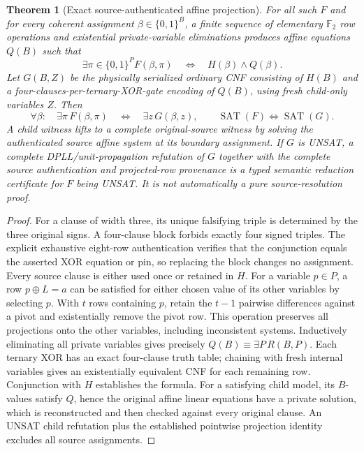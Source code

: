 \documentclass[11pt]{article}
\newtheorem{theorem}{Theorem}
\begin{document}
\begin{theorem}[Exact source-authenticated affine projection]
For all such $F$ and for \emph{every} coherent assignment $\beta\in\{0,1\}^{B}$, a finite sequence of elementary $\mathbb F_2$ row operations and existential private-variable eliminations produces affine equations $Q(B)$ such that
\[
  \exists\pi\in\{0,1\}^{P}F(\beta,\pi)
  \quad\Longleftrightarrow\quad H(\beta)\land Q(\beta).
\]
Let $G(B,Z)$ be the physically serialized ordinary CNF consisting of $H(B)$ and a four-clauses-per-ternary-XOR-gate encoding of $Q(B)$, using fresh child-only variables $Z$. Then
\[
  \forall\beta:\quad \exists\pi\,F(\beta,\pi)
  \quad\Longleftrightarrow\quad \exists z\,G(\beta,z),
  \qquad \operatorname{SAT}(F)\Longleftrightarrow\operatorname{SAT}(G).
\]
A child witness lifts to a complete original-source witness by solving the authenticated source affine system at its boundary assignment. If $G$ is UNSAT, a complete DPLL/unit-propagation refutation of $G$ together with the complete source authentication and projected-row provenance is a \emph{typed semantic reduction certificate} for $F$ being UNSAT. It is not automatically a pure source-resolution proof.
\end{theorem}
\begin{proof}
For a clause of width three, its unique falsifying triple is determined by the three original signs. A four-clause block forbids exactly four signed triples. The explicit exhaustive eight-row authentication verifies that the conjunction equals the asserted XOR equation or pin, so replacing the block changes no assignment. Every source clause is either used once or retained in $H$. For a variable $p\in P$, a row $p\oplus L=a$ can be satisfied for either chosen value of its other variables by selecting $p$. With $t$ rows containing $p$, retain the $t-1$ pairwise differences against a pivot and existentially remove the pivot row. This operation preserves all projections onto the other variables, including inconsistent systems. Inductively eliminating all private variables gives precisely $Q(B)\equiv\exists P\,R(B,P)$. Each ternary XOR has an exact four-clause truth table; chaining with fresh internal variables gives an existentially equivalent CNF for each remaining row. Conjunction with $H$ establishes the formula. For a satisfying child model, its $B$-values satisfy $Q$, hence the original affine linear equations have a private solution, which is reconstructed and then checked against every original clause. An UNSAT child refutation plus the established pointwise projection identity excludes all source assignments.\end{proof}
\end{document}
